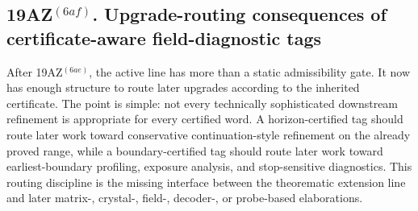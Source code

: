 \subsection*{19AZ$^{(6af)}$. Upgrade-routing consequences of certificate-aware field-diagnostic tags}
\label{sec:upgrade-routing-consequences-of-certificate-aware-field-diagnostic-tags}
After 19AZ$^{(6ae)}$, the active line has more than a static admissibility gate. It now has enough structure to route later upgrades according to the inherited certificate. The point is simple: not every technically sophisticated downstream refinement is appropriate for every certified word. A horizon-certified tag should route later work toward conservative continuation-style refinement on the already proved range, while a boundary-certified tag should route later work toward earliest-boundary profiling, exposure analysis, and stop-sensitive diagnostics. This routing discipline is the missing interface between the theorematic extension line and later matrix-, crystal-, field-, decoder-, or probe-based elaborations.

